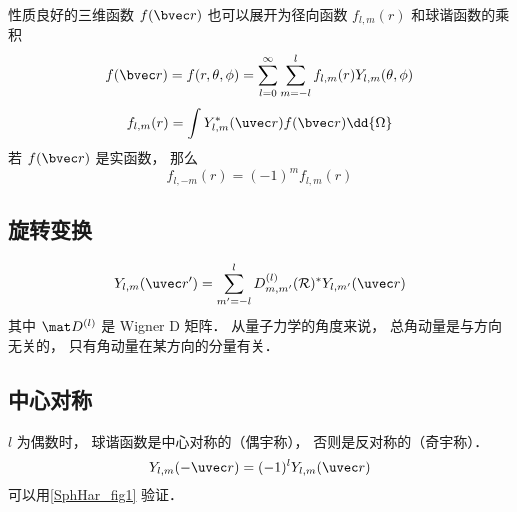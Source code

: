 性质良好的三维函数 $f(\bvec r)$ 也可以展开为径向函数 $f_{l,m}(r)$ 和球谐函数的乘积
\begin{equation}\label{SphHar_eq9}
f(\bvec r) = f(r, \theta, \phi) = \sum_{l = 0}^\infty\sum_{m=-l}^l f_{l,m}(r) Y_{l,m}(\theta, \phi)
\end{equation}
\begin{equation}\label{SphHar_eq7}
f_{l,m}(r) = \int Y^*_{l,m}(\uvec r) f(\bvec r) \dd{\Omega}
\end{equation}
若 $f(\bvec r)$ 是实函数， 那么
\begin{equation}
f_{l,-m}(r) = (-1)^m f_{l,m}(r)
\end{equation}

\subsection{旋转变换}
\begin{equation}
Y_{l,m}(\uvec r') = \sum_{m'=-l}^l D_{m,m'}^{(l)} (\mathcal R)^* Y_{l,m'}(\uvec r)
\end{equation}
其中 $\mat D^{(l)}$ 是 Wigner D 矩阵． 从量子力学的角度来说， 总角动量是与方向无关的， 只有角动量在某方向的分量有关．

\subsection{中心对称}
$l$ 为偶数时， 球谐函数是中心对称的（偶宇称）， 否则是反对称的（奇宇称）．
\begin{equation}\label{SphHar_eq8}
Y_{l,m}(-\uvec r) = (-1)^l Y_{l,m}(\uvec r)
\end{equation}
可以用\autoref{SphHar_fig1} 验证．

